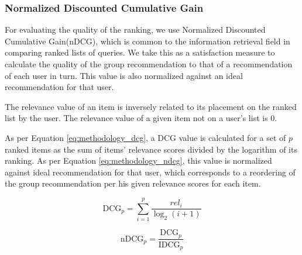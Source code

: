 \subsubsection{Normalized Discounted Cumulative Gain}
For evaluating the quality of the ranking, we use Normalized Discounted Cumulative Gain(nDCG), which is common to the information retrieval field in comparing ranked lists of queries. We take this as a satisfaction measure to calculate the quality of the group recommendation to that of a recommendation of each user in turn. This value is also normalized against an ideal recommendation for that user.


The relevance value of an item is inversely related to its placement on the ranked list by the user. The relevance value of a given item not on a user's list is 0.

As per Equation \ref{eq:methodology_dcg}, a DCG value is calculated for a set of $p$ ranked items as the sum of items' relevance scores divided by the logarithm of its ranking. As per Equation \ref{eq:methodology_ndcg}, this value is normalized against ideal recommendation for that user, which corresponds to a reordering of the group recommendation per his given relevance scores for each item.

\begin{equation}\label{eq:methodology_dcg}
\text{DCG}_p = \sum_{i=1}^{p}\frac{\textit{rel}_i}{\log_2(i + 1)}
\end{equation}

\begin{equation}\label{eq:methodology_ndcg}
\text{nDCG}_p = \frac{\text{DCG}_p}{\text{IDCG}_p}
\end{equation}